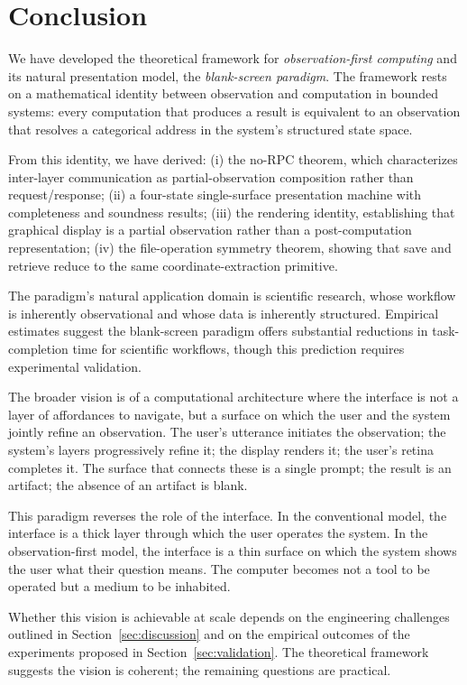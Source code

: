 \documentclass[11pt,twocolumn,a4paper]{article}
\theoremstyle{definition}
\theoremstyle{remark}
\begin{document}
\section{Conclusion}
\label{sec:conclusion}

We have developed the theoretical framework for \emph{observation-first computing} and its natural presentation model, the \emph{blank-screen paradigm}. The framework rests on a mathematical identity between observation and computation in bounded systems: every computation that produces a result is equivalent to an observation that resolves a categorical address in the system's structured state space.

From this identity, we have derived: (i) the no-RPC theorem, which characterizes inter-layer communication as partial-observation composition rather than request/response; (ii) a four-state single-surface presentation machine with completeness and soundness results; (iii) the rendering identity, establishing that graphical display is a partial observation rather than a post-computation representation; (iv) the file-operation symmetry theorem, showing that save and retrieve reduce to the same coordinate-extraction primitive.

The paradigm's natural application domain is scientific research, whose workflow is inherently observational and whose data is inherently structured. Empirical estimates suggest the blank-screen paradigm offers substantial reductions in task-completion time for scientific workflows, though this prediction requires experimental validation.

The broader vision is of a computational architecture where the interface is not a layer of affordances to navigate, but a surface on which the user and the system jointly refine an observation. The user's utterance initiates the observation; the system's layers progressively refine it; the display renders it; the user's retina completes it. The surface that connects these is a single prompt; the result is an artifact; the absence of an artifact is blank.

This paradigm reverses the role of the interface. In the conventional model, the interface is a thick layer through which the user operates the system. In the observation-first model, the interface is a thin surface on which the system shows the user what their question means. The computer becomes not a tool to be operated but a medium to be inhabited.

Whether this vision is achievable at scale depends on the engineering challenges outlined in Section~\ref{sec:discussion} and on the empirical outcomes of the experiments proposed in Section~\ref{sec:validation}. The theoretical framework suggests the vision is coherent; the remaining questions are practical.



\end{document}

